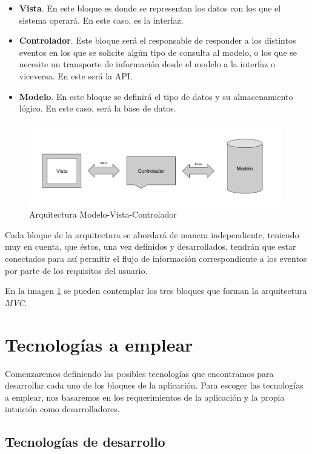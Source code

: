  \begin{itemize}
    \item \textbf{Vista}. En este bloque es donde se representan los datos con los que el sistema operará. En este caso, es la interfaz.
    \item \textbf{Controlador}. Este bloque será el responsable de responder a los distintos eventos en los que se solicite algún tipo de consulta al modelo, o los que se necesite un transporte de información desde el modelo a la interfaz o viceversa. En este será la API.
    \item \textbf{Modelo}. En este bloque se definirá el tipo de datos y su almacenamiento lógico. En este caso, será la base de datos.
\end{itemize}
\begin{figure}[htbp]
    \centerline{\includegraphics[width=11cm]{figuras/mvc.png}}
    \caption{Arquitectura Modelo-Vista-Controlador}
    \label{fig::mvc}
\end{figure}
Cada bloque de la arquitectura se abordará de manera independiente, teniendo muy en cuenta, que éstos, una vez definidos y desarrollados, tendrán que estar conectados para así permitir el flujo de información correspondiente a los eventos por parte de los requisitos del usuario. 

En la imagen \ref{fig::mvc} se pueden contemplar los tres bloques que forman la arquitectura \textit{MVC}.


 
\section{Tecnologías a emplear}

Comenzaremos definiendo las posibles tecnologías que encontramos para desarrollar cada uno de los bloques de la aplicación. Para escoger las tecnologías a emplear, nos basaremos en los requerimientos de la aplicación y la propia intuición como desarrolladores.

\subsection{Tecnologías de desarrollo}

